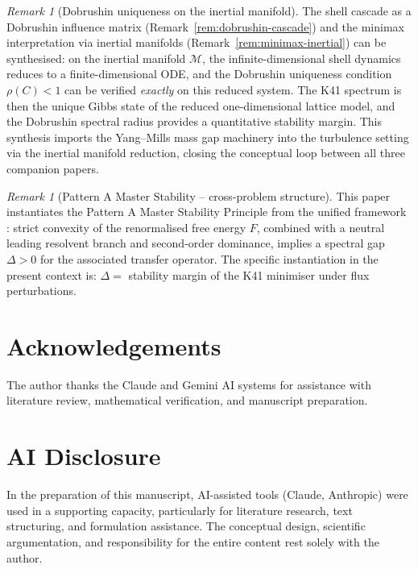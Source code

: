 \documentclass[12pt,a4paper]{article}
\theoremstyle{definition}
\theoremstyle{plain}
\theoremstyle{remark}
\newtheorem{remark}[definition]{Remark}
\begin{document}
\begin{remark}[Dobrushin uniqueness on the inertial manifold]
\label{rem:dobrushin-inertial}
The shell cascade as a Dobrushin influence matrix
(Remark~\ref{rem:dobrushin-cascade}) and the minimax interpretation
via inertial manifolds (Remark~\ref{rem:minimax-inertial}) can be
synthesised: on the inertial manifold $\mathcal{M}$, the
infinite-dimensional shell dynamics reduces to a finite-dimensional ODE,
and the Dobrushin uniqueness condition $\rho(C) < 1$ can be verified
\emph{exactly} on this reduced system. The K41 spectrum is then the
unique Gibbs state of the reduced one-dimensional lattice model, and
the Dobrushin spectral radius provides a quantitative stability margin.
This synthesis imports the Yang--Mills mass gap machinery into the
turbulence setting via the inertial manifold reduction, closing the
conceptual loop between all three companion papers.
\end{remark}

\begin{remark}[Pattern A Master Stability -- cross-problem structure]
This paper instantiates the Pattern A Master Stability Principle from the unified framework \cite{FST-Unified2026}: strict convexity of the renormalised free energy $F$, combined with a neutral leading resolvent branch and second-order dominance, implies a spectral gap $\Delta > 0$ for the associated transfer operator. The specific instantiation in the present context is: $\Delta = $ stability margin of the K41 minimiser under flux perturbations.
\end{remark}

\section*{Acknowledgements}

The author thanks the Claude and Gemini AI systems for assistance with literature review, mathematical verification, and manuscript preparation.

\section*{AI Disclosure}
In the preparation of this manuscript, AI-assisted tools (Claude, Anthropic)
were used in a supporting capacity, particularly for literature research,
text structuring, and formulation assistance.  The conceptual design,
scientific argumentation, and responsibility for the entire content
rest solely with the author.
\end{document}

